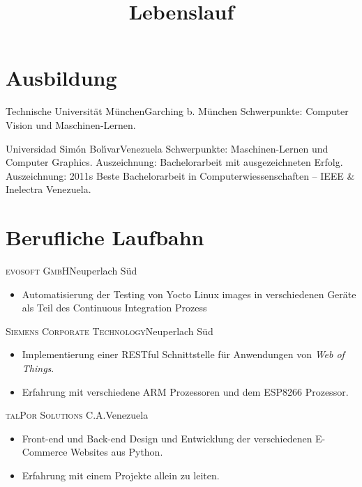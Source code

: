 \documentclass[10pt]{moderncv}
\title{Lebenslauf}
\begin{document}
\maketitle

\section{Ausbildung}

{Technische Universit\"at M\"unchen}{Garching b. M\"{u}nchen}{}{%
    Schwerpunkte: Computer Vision und Maschinen-Lernen.
  }

  {Universidad Sim\'on Bol\'{\i}var}{Venezuela}{}{%
    Schwerpunkte: Maschinen-Lernen und Computer Graphics.
    \newline
    Auszeichnung: Bachelorarbeit mit ausgezeichneten Erfolg.
    \newline
    Auszeichnung: 2011s Beste Bachelorarbeit in Computerwiessenschaften -- IEEE \& Inelectra Venezuela.
  }

\section{Berufliche Laufbahn}

{\textsc{evosoft GmbH}}{Neuperlach S\"{u}d}{}{%
\begin{itemize}
  \item Automatisierung der Testing von Yocto Linux images in verschiedenen 
    Ger\"ate als Teil des Continuous Integration Prozess
\end{itemize}
}

{\textsc{Siemens Corporate Technology}}{Neuperlach S\"{u}d}{}{%
\begin{itemize}
  \item Implementierung einer RESTful Schnittstelle f\"{u}r Anwendungen von 
    \textit{Web of Things}.
  \item Erfahrung mit verschiedene ARM Prozessoren und dem ESP8266 Prozessor.
\end{itemize}
}

{\textsc{talPor Solutions C.A.}}{Venezuela}{}{%
\begin{itemize}
  \item Front-end und Back-end Design und Entwicklung der verschiedenen E-Commerce 
    Websites aus Python.
  \item Erfahrung mit einem Projekte allein zu leiten.
\end{itemize}
}
\end{document}
